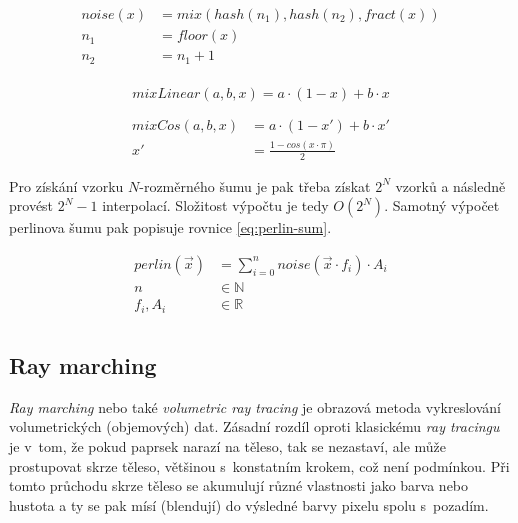 \documentclass[a4paper, 12pt]{article}
\begin{document}
\begin{equation}
  \begin{aligned}
    noise(x) & = mix(hash(n_1), hash(n_2), fract(x)) \\
    n_1 & = floor(x) \\
    n_2 & = n_1 + 1 \\
  \end{aligned}
  \label{eq:floating-noise}
\end{equation}

\begin{equation}
    mixLinear(a, b, x) = a \cdot (1 - x) + b \cdot x
  \label{eq:mix-lin}
\end{equation}

\begin{equation}
  \begin{aligned}
    mixCos(a, b, x) & = a \cdot (1 - x') + b \cdot x' \\
    x' & = \frac{1 - cos(x \cdot \pi)}{2}
  \end{aligned}
  \label{eq:mix-cos}
\end{equation}

Pro získání vzorku $N$-rozměrného šumu je pak třeba získat $2^N$ vzorků
a následně provést $2^N-1$ interpolací. Složitost výpočtu je tedy $O(2^N)$.
Samotný výpočet perlinova šumu pak popisuje
rovnice \ref{eq:perlin-sum}.

\begin{equation}
  \begin{aligned}
    perlin(\vec{x}) & = \sum^{n}_{i=0} noise(\vec{x} \cdot f_i) \cdot A_i \\
    n & \in \mathbb{N} \\
    f_i, A_i & \in \mathbb{R} \\
  \end{aligned}
  \label{eq:perlin-sum}
\end{equation}

\subsection{Ray marching}

\textit{Ray marching} nebo také \textit{volumetric ray tracing} je obrazová
metoda vykreslování volumetrických (objemových) dat.
Zásadní rozdíl oproti klasickému \textit{ray tracingu} je v~tom, že pokud
paprsek narazí na těleso, tak se nezastaví, ale může prostupovat skrze těleso,
většinou s~konstatním krokem, což není podmínkou.
Při tomto průchodu skrze těleso se akumulují různé vlastnosti
jako barva nebo hustota a ty se pak mísí (blendují) do výsledné barvy pixelu
spolu s~pozadím. \cite{url:wiki-ray-marching}
\end{document}
